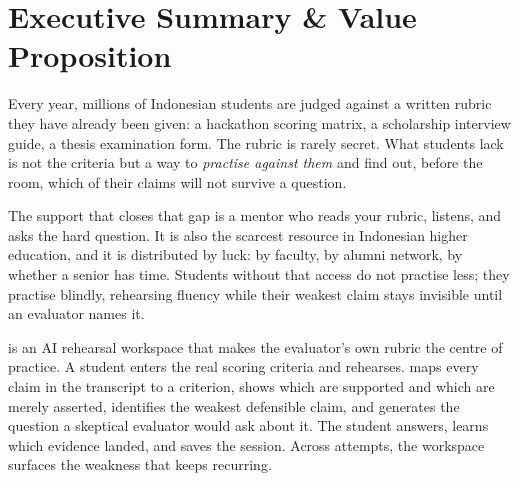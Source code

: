 
\section{Executive Summary \& Value Proposition}

Every year, millions of Indonesian students are judged against a written rubric
they have already been given: a hackathon scoring matrix, a scholarship
interview guide, a thesis examination form. The rubric is rarely secret. What
students lack is not the criteria but a way to \emph{practise against them} and
find out, before the room, which of their claims will not survive a question.

The support that closes that gap is a mentor who reads your rubric, listens,
and asks the hard question. It is also the scarcest resource in Indonesian
higher education, and it is distributed by luck: by faculty, by alumni network,
by whether a senior has time. Students without that access do not practise less;
they practise blindly, rehearsing fluency while their weakest claim stays
invisible until an evaluator names it.

\ProductName{} is an AI rehearsal workspace that makes the evaluator's own
rubric the centre of practice. A student enters the real scoring criteria and
rehearses. \ProductName{} maps every claim in the transcript to a criterion,
shows which are supported and which are merely asserted, identifies the weakest
defensible claim, and generates the question a skeptical evaluator would ask
about it. The student answers, learns which evidence landed, and saves the
session. Across attempts, the workspace surfaces the weakness that keeps
recurring.


